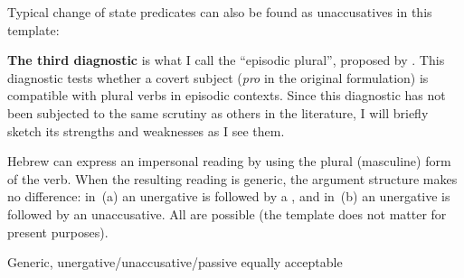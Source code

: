 \begin{exe}
\begin{xlist}
\begin{exe}
\begin{xlist}
\begin{exe}
\begin{xlist}
\begin{exe}
\begin{exe}
\begin{xlist}
\begin{exe}
\begin{xlist}
\begin{exe}
\begin{xlist}
\begin{exe}
\begin{xlist}
\begin{exe}
\begin{xlist}
	
	

	
 \z
\z 

Typical change of state predicates can also be found as unaccusatives in this template:
 \begin{exe}
 \ex  
 \begin{xlist} 
	
	
 \z
\z 


\textbf{The third diagnostic} is what I call the ``episodic plural'', proposed by \cite{borer98csli,borer05vol2}. This diagnostic tests whether a covert subject (\emph{pro} in the original formulation) is compatible with plural verbs in episodic contexts. Since this diagnostic has not been subjected to the same scrutiny as others in the literature, I will briefly sketch its strengths and weaknesses as I see them.

Hebrew can express an impersonal reading by using the plural (masculine) form of the verb. When the resulting reading is generic, the argument structure makes no difference: in~(\nextx a) an unergative is followed by a , and in~(\nextx b) an unergative is followed by an unaccusative. All are possible (the template does not matter for present purposes).
 \begin{exe}
 \ex  Generic, unergative/unaccusative/passive equally acceptable \citep[86]{borer98csli} 
 \begin{xlist} 
	

\end{xlist}
\end{exe}
\end{xlist}
\end{exe}
\end{xlist}
\end{exe}
\end{xlist}
\end{exe}
\end{xlist}
\end{exe}
\end{xlist}
\end{exe}
\end{xlist}
\end{exe}
\end{exe}
\end{xlist}
\end{exe}
\end{xlist}
\end{exe}
\end{xlist}
\end{exe}
